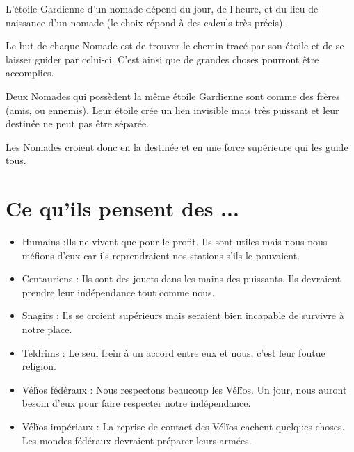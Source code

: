 \begin{multicols}{2}
L'étoile Gardienne d'un nomade dépend du jour, de l'heure, et du lieu de naissance d'un nomade (le choix répond à des calculs très précis).

Le but de chaque Nomade est de trouver le chemin tracé par son étoile et de se laisser guider par celui-ci. C'est ainsi que de grandes choses pourront être accomplies. 

Deux Nomades qui possèdent la même étoile Gardienne sont comme des frères (amis, ou ennemis). Leur étoile crée un lien invisible mais très puissant et leur destinée ne peut pas être séparée.

Les Nomades croient donc en la destinée et en une force supérieure qui les guide tous.

\section{Ce qu'ils pensent des ...}

\begin{itemize}
\item Humains :Ils ne vivent que pour le profit. Ils sont utiles mais nous nous méfions d'eux car ils reprendraient nos stations s'ils le pouvaient.
\item Centauriens : Ils sont des jouets dans les mains des puissants. Ils devraient prendre leur indépendance tout comme nous.
\item Snagirs : Ils se croient supérieurs mais seraient bien incapable de survivre à notre place.
\item Teldrims : Le seul frein à un accord entre eux et nous, c'est leur foutue religion.
\item Vélïos fédéraux : Nous respectons beaucoup les Vélïos. Un jour, nous auront besoin d'eux pour faire respecter notre indépendance.
\item Vélïos impériaux : La reprise de contact des Vélïos cachent quelques choses. Les mondes fédéraux devraient préparer leurs armées.
\end{itemize}

\end{multicols}


